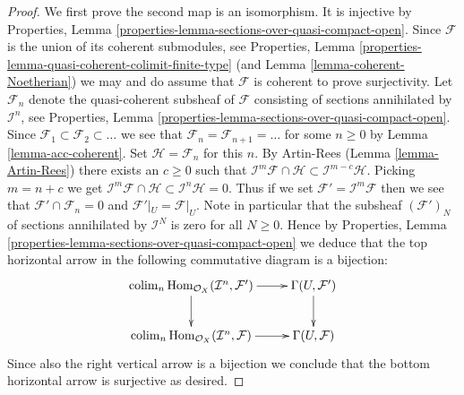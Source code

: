 \documentclass[10pt,a4paper]{amsart}
\theoremstyle{plain}
\theoremstyle{definition}
\theoremstyle{remark}
\numberwithin{equation}{subsection}
\def\colim{\mathop{\mathrm{colim}}\nolimits}
\def\Hom{\mathop{\mathrm{Hom}}\nolimits}
\begin{document}
\begin{proof}
We first prove the second map is an isomorphism. It is injective by 
Properties, Lemma \ref{properties-lemma-sections-over-quasi-compact-open}.
Since $\mathcal{F}$ is the union of its coherent submodules, see
Properties, Lemma \ref{properties-lemma-quasi-coherent-colimit-finite-type}
(and Lemma \ref{lemma-coherent-Noetherian})
we may and do assume that $\mathcal{F}$ is coherent to prove surjectivity.
Let $\mathcal{F}_n$ denote the quasi-coherent subsheaf of $\mathcal{F}$
consisting of sections annihilated by $\mathcal{I}^n$,
see Properties, Lemma \ref{properties-lemma-sections-over-quasi-compact-open}.
Since $\mathcal{F}_1 \subset \mathcal{F}_2 \subset \ldots$ we see that
$\mathcal{F}_n = \mathcal{F}_{n + 1} = \ldots $ for some $n \geq 0$
by Lemma \ref{lemma-acc-coherent}. Set $\mathcal{H} = \mathcal{F}_n$
for this $n$. By Artin-Rees (Lemma \ref{lemma-Artin-Rees})
there exists an $c \geq 0$ such that
$\mathcal{I}^m\mathcal{F} \cap \mathcal{H}
\subset \mathcal{I}^{m - c}\mathcal{H}$. Picking $m = n + c$ we get
$\mathcal{I}^m\mathcal{F} \cap \mathcal{H} \subset \mathcal{I}^n\mathcal{H}
= 0$. Thus if we set $\mathcal{F}' = \mathcal{I}^m\mathcal{F}$ then we
see that $\mathcal{F}' \cap \mathcal{F}_n = 0$ and
$\mathcal{F}'|_U = \mathcal{F}|_U$. Note in particular that the subsheaf
$(\mathcal{F}')_N$ of sections annihilated by $\mathcal{I}^N$ is zero
for all $N \geq 0$. Hence by
Properties, Lemma \ref{properties-lemma-sections-over-quasi-compact-open}
we deduce that
the top horizontal arrow in the following commutative
diagram is a bijection:
$$
\xymatrix{
\colim_n \Hom_{\mathcal{O}_X}(
\mathcal{I}^n, \mathcal{F}')
\ar[r] \ar[d] &
\Gamma(U, \mathcal{F}') \ar[d] \\
\colim_n \Hom_{\mathcal{O}_X}(
\mathcal{I}^n, \mathcal{F})
\ar[r] &
\Gamma(U, \mathcal{F})
}
$$
Since also the right vertical arrow is a bijection we conclude that
the bottom horizontal arrow is surjective as desired.


\end{proof}
\end{document}
